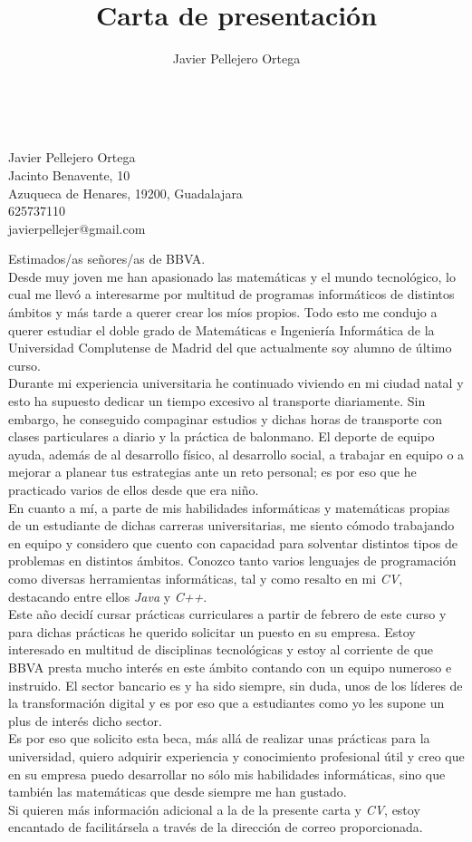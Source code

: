 \documentclass[11pt, oneside]{book}
\title{Carta de presentación}
\author{Javier Pellejero Ortega}
\begin{document}
\ \\
\begin{flushright}
Javier Pellejero Ortega\\
Jacinto Benavente, 10\\
Azuqueca de Henares, 19200, Guadalajara\\
625737110\\
javierpellejer@gmail.com\\
\end{flushright}

Estimados/as señores/as de BBVA.\\

Desde muy joven me han apasionado las matemáticas y el mundo tecnológico, lo cual me llevó a interesarme por multitud de programas informáticos de distintos ámbitos y más tarde a querer crear los míos propios. Todo esto me condujo a querer estudiar el doble grado de Matemáticas e Ingeniería Informática de la Universidad Complutense de Madrid del que actualmente soy alumno de último curso.\\

Durante mi experiencia universitaria he continuado viviendo en mi ciudad natal y esto ha supuesto dedicar un tiempo excesivo al transporte diariamente. Sin embargo, he conseguido compaginar estudios y dichas horas de transporte con clases particulares a diario y la práctica de balonmano. El deporte de equipo ayuda, además de al desarrollo físico, al desarrollo social, a trabajar en equipo o a mejorar a planear tus estrategias ante un reto personal; es por eso que he practicado varios de ellos desde que era niño.\\

En cuanto a mí, a parte de mis habilidades informáticas y matemáticas propias de un estudiante de dichas carreras universitarias, me siento cómodo trabajando en equipo y considero que cuento con capacidad para solventar distintos tipos de problemas en distintos ámbitos. Conozco tanto varios lenguajes de programación como diversas herramientas informáticas, tal y como resalto en mi \textit{CV}, destacando entre ellos \textit{Java} y \textit{C++}.\\

Este año decidí cursar prácticas curriculares a partir de febrero de este curso y para dichas prácticas he querido solicitar un puesto en su empresa. Estoy interesado en multitud de disciplinas tecnológicas y estoy al corriente de que BBVA presta mucho interés en este ámbito contando con un equipo numeroso e instruido. El sector bancario es y ha sido siempre, sin duda, unos de los líderes de la transformación digital y es por eso que a estudiantes como yo les supone un plus de interés dicho sector.\\

Es por eso que solicito esta beca, más allá de realizar unas prácticas para la universidad, quiero adquirir experiencia y conocimiento profesional útil y creo que en su empresa puedo desarrollar no sólo mis habilidades informáticas, sino que también las matemáticas que desde siempre me han gustado.\\

Si quieren más información adicional a la de la presente carta y \textit{CV}, estoy encantado de facilitársela a través de la dirección de correo proporcionada.
\end{document}

